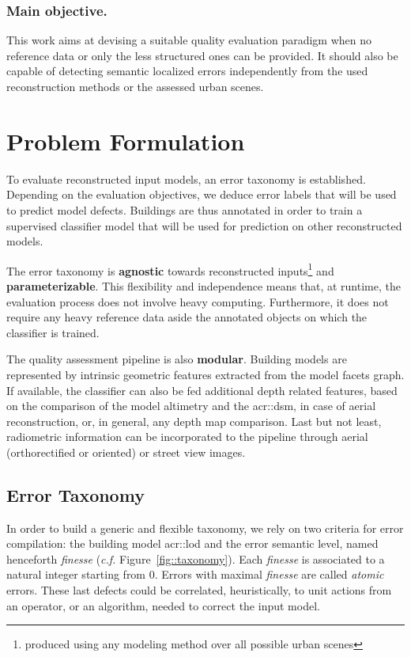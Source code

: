 \documentclass[runningheads]{llncs}
\begin{document}
\subsubsection{Main objective.}
This work aims at devising a suitable quality evaluation paradigm when no reference data or only the less structured ones can be provided. It should also be capable of detecting semantic localized errors independently from the used reconstruction methods or the assessed urban scenes.

\section{Problem Formulation}

To evaluate reconstructed input models, an error taxonomy is established. Depending on the evaluation objectives, we deduce error labels that will be used to predict model defects. Buildings are thus annotated in order to train a supervised classifier model that will be used for prediction on other reconstructed models.

The error taxonomy is \textbf{agnostic} towards reconstructed inputs\footnote{produced using any modeling method over all possible urban scenes} and \textbf{parameterizable}. This flexibility and independence means that, at runtime, the evaluation process does not involve heavy computing. Furthermore, it does not require any heavy reference data aside the annotated objects on which the classifier is trained.

The quality assessment pipeline is also \textbf{modular}. Building models are represented by intrinsic geometric features extracted from the model facets graph. If available, the classifier can also be fed additional depth related features, based on the comparison of the model altimetry and the \acrshort{acr::dsm}, in case of aerial reconstruction, or, in general, any depth map comparison. Last but not least, radiometric information can be incorporated to the pipeline through aerial (orthorectified or oriented) or street view images.

\subsection{Error Taxonomy}
In order to build a generic and flexible taxonomy, we rely on two criteria for error compilation: the building model \acrshort{acr::lod} and the error semantic level, named henceforth \textit{finesse} (\textit{c.f.} Figure~\ref{fig::taxonomy}). Each \textit{finesse} is associated to a natural integer starting from $0$. Errors with maximal \textit{finesse} are called \textit{atomic} errors. These last defects could be correlated, heuristically, to unit actions from an operator, or an algorithm, needed to correct the input model.
\end{document}
